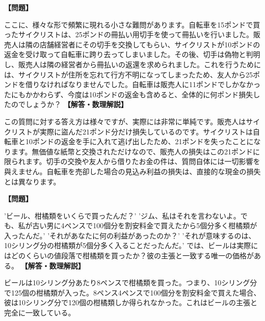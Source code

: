 \documentclass[10pt,a4paper,oneside,openany]{ltjsbook}
\begin{document}
\begin{tcolorbox}[colback=softblue,colframe=primaryblue,title=\textbf{第 38 問：自転車竊盜事件 （原題: THE BICYCLE THIEF.）},arc=2mm,boxrule=1pt,breakable]
\textbf{【問題】}\par\vspace{0.3em}
ここに、様々な形で頻繁に現れる小さな難問があります。自転車を15ポンドで買ったサイクリストは、25ポンドの冊払い用切手を使って冊払いを行いました。販売人は隣の店舗経営者にその切手を交換してもらい、サイクリストが10ポンドの返金を受け取って自転車に跨り去ってしまいました。その後、切手は偽物と判明し、販売人は隣の経営者から冊払いの返還を求められました。これを行うためには、サイクリストが住所を忘れて行方不明になってしまったため、友人から25ポンドを借りなければなりませんでした。自転車は販売人に11ポンドでしかなかったにもかかわらず、今度は10ポンドの返金も含めると、全体的に何ポンド損失したのでしょうか？
\tcblower
\textbf{【解答・数理解説】}\par\vspace{0.3em}
この質問に対する答え方は様々ですが、実際には非常に単純です。販売人はサイクリストが実際に盜んだ21ポンド分だけ損失しているのです。サイクリストは自転車と10ポンドの返金を手に入れて逃げ出したため、21ポンドを失ったことになります。無価値な紙幣と交換されただけなので、販売人の損失はこの21ポンドに限られます。切手の交換や友人から借りたお金の件は、質問自体には一切影響を與えません。自転車を売卻した場合の見込み利益の損失は、直接的な現金の損失とは異なります。
\end{tcolorbox}

\begin{tcolorbox}[colback=softblue,colframe=primaryblue,title=\textbf{第 39 問：野菜商のパズル （原題: THE COSTERMONGER'S PUZZLE.）},arc=2mm,boxrule=1pt,breakable]
\textbf{【問題】}\par\vspace{0.3em}
'ビール、柑橘類をいくらで買ったんだ？' 'ジム、私はそれを言わないよ。でも、私が古い男に4ペンスで100個分を割安料金で買えたから5個分多く柑橘類が入ったんだ。' 'それがあなたに何の利益があったのか？' 'それが意味するのは、10シリング分の柑橘類が5個分多く入ることだったんだ。' では、ビールは実際にはどのくらいの値段落で柑橘類を買ったか？彼の主張と一致する唯一の価格がある。
\tcblower
\textbf{【解答・数理解説】}\par\vspace{0.3em}
ビールは10シリング分あたり8ペンスで柑橘類を買った。つまり、10シリング分で125個の柑橘類が入った。8ペンス4ペンスで100個分を割安料金で買えた場合、彼は10シリング分で120個の柑橘類しか得られなかった。これはビールの主張と完全に一致している。
\end{tcolorbox}
\end{document}
